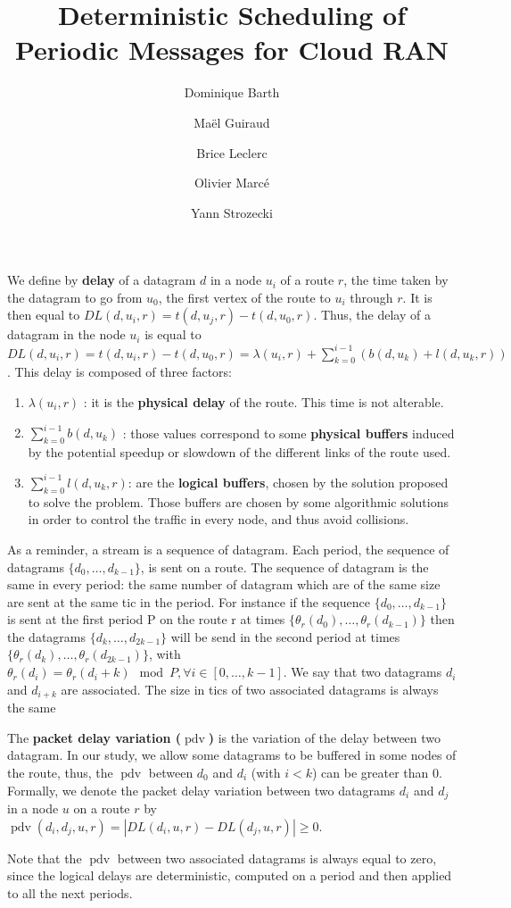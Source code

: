 \documentclass[10pt]{article}
\title{Deterministic Scheduling of Periodic Messages for Cloud RAN}
\author[1]{Dominique Barth}
\author[1,2]{Ma\"el Guiraud}
\author[2]{Brice Leclerc}
\author[2]{Olivier Marc\'e}
\author[1]{Yann Strozecki}
\affil[1]{David Laboratory, UVSQ}
\affil[2]{Nokia Bell Labs France}
\DeclareMathOperator{\pdv}{pdv}
\begin{document}
We define by {\bf delay} of a datagram $d$ in a node $u_i$ of a route $r$, the time taken by the datagram to go from $u_0$, the first vertex of the route to $u_i$ through $r$. It is then equal to $DL(d,u_i,r) = t(d,u_j,r) - t(d,u_0,r)$. 
 Thus, the delay of a datagram in the node $u_i$ is equal to $DL(d,u_i,r) =  t(d,u_i,r) - t(d,u_0,r) = \lambda(u_i,r) + \sum_{k=0}^{i-1}( b(d,u_k) + l(d,u_k,r))$.
This delay is composed of three factors:
\begin{enumerate}
\item $\lambda(u_i,r)$ : it is the {\bf physical delay} of the route. This time is not alterable. 
\item  $\sum_{k=0}^{i-1} b(d,u_k)$ : those values correspond to some {\bf physical buffers } induced by the potential speedup or slowdown of the different links of the route used.
\item $\sum_{k=0}^{i-1} l(d,u_k,r)$: are the {\bf logical buffers}, chosen by the solution proposed to solve the problem. Those buffers are chosen by some algorithmic solutions in order to control the traffic in every node, and thus avoid collisions.
\end{enumerate}

As a reminder, a stream is a sequence of datagram. Each period, the sequence of datagrams $\{d_0,\ldots,d_{k-1}\}$, is sent on a route. The sequence of datagram is the same in every period: the same number of datagram which are of the same size are sent at the same tic in the period. For instance if the sequence $\{d_0,\ldots,d_{k-1}\}$ is sent at the first period P on the route r at times $\{\theta_r(d_0),\ldots,\theta_r(d_{k-1})\}$ then the datagrams $\{d_k,\ldots,d_{2k-1}\}$ will be send in the second period at times $\{\theta_r(d_k),\ldots,\theta_r(d_{2k-1})\}$, with $\theta_r(d_i) = \theta_r(d_i+k) \mod P, \forall i \in [0,\ldots,k-1]$. We say that two datagrams $d_i$ and $d_{i+k}$ are associated. The size in tics of two associated datagrams is always the same

The {\bf packet delay variation ($\pdv$) }\cite{demichelis_ip_nodate} is the variation of the delay between two datagram. In our study, we allow some datagrams to be buffered in some nodes of the route, thus, the $\pdv$ between $d_0$ and $d_i$ (with $i<k$) can be greater than $0$. Formally, we denote the packet delay variation between two datagrams $d_i$ and $d_j$ in a node $u$ on a route $r$ by $\pdv(d_i,d_j,u,r) = |DL(d_i,u,r) - DL(d_j,u,r) | \ge 0$. 

Note that the $\pdv$ between two associated datagrams is always equal to zero, since the logical delays are deterministic, computed on a period and then applied to all the next periods.
\end{document}

